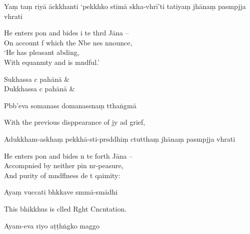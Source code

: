Yaṃ taṃ riyā āckkhanti `pekkhko stimā skha-vhrī'ti tatiyaṃ jhānaṃ pasmpjja vhrati

\begin{english}
  He enters pon and bides i te thrd Jāna --\\
  On account f which the Nbe nes nnounce,\\
  `He has  pleasant abding,\\
  With equanmty and is mndful.'
\end{english}

\begin{twochants}

Sukhassa c pahānā &
 \\

Dukkhassa c pahānā &
 \\

\end{twochants}

\clearpage

Pbb'eva somanass domanassnaṃ tthaṅgmā

\begin{english}
  With the previous disppearance of jy ad grief,
\end{english}

Adukkham-askhaṃ pekkhā-sti-prsddhiṃ ctutthaṃ jhānaṃ pasmpjja vhrati

\begin{english}
  He enters pon and bides n te forth Jāna --\\
  Accompnied by neither pin nr-peasure,\\
  And purity of mndflness de t qaimity:
\end{english}

Ayaṃ vuccati bhkkave smmā-smādhi

\begin{english}
  This bhikkhus is clled Rght Cncntation.
\end{english}

Ayam-eva riyo aṭṭhṅgko maggo

